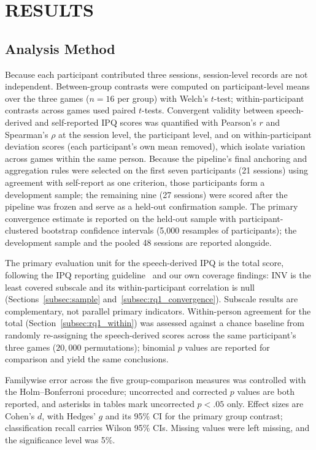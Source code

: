 \section{RESULTS}
\label{sec:result}

\subsection{Analysis Method}
\label{subsec:analysis}


Because each participant contributed three sessions, session-level records are not independent. Between-group contrasts were computed on participant-level means over the three games ($n=16$ per group) with Welch's $t$-test; within-participant contrasts across games used paired $t$-tests. Convergent validity between speech-derived and self-reported IPQ scores was quantified with Pearson's $r$ and Spearman's $\rho$ at the session level, the participant level, and on within-participant deviation scores (each participant's own mean removed), which isolate variation across games within the same person. Because the pipeline's final anchoring and aggregation rules were selected on the first seven participants (21 sessions) using agreement with self-report as one criterion, those participants form a development sample; the remaining nine (27 sessions) were scored after the pipeline was frozen and serve as a held-out confirmation sample. The primary convergence estimate is reported on the held-out sample with participant-clustered bootstrap confidence intervals (5{,}000 resamples of participants); the development sample and the pooled 48 sessions are reported alongside.

The primary evaluation unit for the speech-derived IPQ is the total score, following the IPQ reporting guideline~\cite{tran2024ipq} and our own coverage findings: INV is the least covered subscale and its within-participant correlation is null (Sections~\ref{subsec:sample} and~\ref{subsec:rq1_convergence}). Subscale results are complementary, not parallel primary indicators. Within-person agreement for the total (Section~\ref{subsec:rq1_within}) was assessed against a chance baseline from randomly re-assigning the speech-derived scores across the same participant's three games ($20{,}000$ permutations); binomial $p$ values are reported for comparison and yield the same conclusions.

Familywise error across the five group-comparison measures was controlled with the Holm--Bonferroni procedure; uncorrected and corrected $p$ values are both reported, and asterisks in tables mark uncorrected $p<.05$ only. Effect sizes are Cohen's $d$, with Hedges' $g$ and its 95\% CI for the primary group contrast; classification recall carries Wilson 95\% CIs. Missing values were left missing, and the significance level was 5\%.

